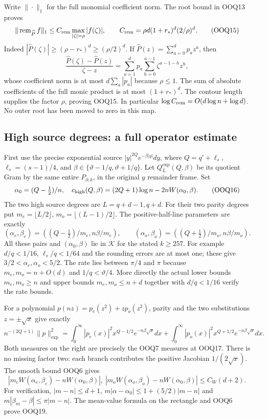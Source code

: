 \documentclass[11pt,a4paper]{article}
\begin{document}
Write $\|\cdot\|_1$ for the full monomial coefficient norm.
The root bound in OOQ13 proves
\[
\|\operatorname{rem}_{\widehat P}f\|_1
 \le C_{\rm rem}\max_{|\zeta|=\rho}|f(\zeta)|,\qquad
C_{\rm rem}=\rho d(1+r_*)^d(2/\rho)^d .
 \tag{OOQ15}
\]
Indeed $|\widehat P(\zeta)|\ge(\rho-r_*)^d\ge(\rho/2)^d$.
If $\widehat P(z)=\sum_{a=0}^d p_a z^a$, then
\[
\frac{\widehat P(\zeta)-\widehat P(z)}{\zeta-z}
 =\sum_{a=1}^d p_a\sum_{h=0}^{a-1}\zeta^{a-1-h}z^h,
\]
whose coefficient norm is at most $d\sum_a|p_a|$
because $\rho\le1$. The sum of absolute coefficients of
the full monic product is at most $(1+r_*)^d$.
The contour length supplies the factor $\rho$, proving OOQ15.
In particular $\log C_{\rm rem}=O(d\log n+\log d)$.
No outer root has been moved to zero in this map.

\subsection{High source degrees: a full operator estimate}

First use the precise exponential source
$|y|^{2Q}e^{-\beta|y|}dy$, where
$Q=q'+\ell_s$, $\ell_s=(s-1)/4$, and
$\beta\in\{\vartheta-1/q,\vartheta+1/q\}$.
Let $Q_{L}^{\exp}(Q,\beta)$ be its quotient Gram by the same
entire $P_{\partial,k}$, in the original $y$ remainder frame.
Set
\[
\alpha_0=(Q-\tfrac12)/n,\quad
c_{\rm high}(Q,\beta)=(2Q+1)\log n-2nW(\alpha_0,\beta).
\tag{OOQ16}
\]
The two high source degrees are $L=q+d-1,q+d$.
For their two parity degrees put
$m_e=\lfloor L/2\rfloor$, $m_o=\lfloor(L-1)/2\rfloor$.
The positive-half-line parameters are exactly
\[
(\alpha_e,\beta_e)=((Q-\tfrac12)/m_e,n\beta/m_e),\qquad
(\alpha_o,\beta_o)=((Q+\tfrac12)/m_o,n\beta/m_o).
\tag{OOQ17}
\]
All these pairs and $(\alpha_0,\beta)$ lie in $\mathcal K$
for the stated $k\ge257$. For example
$d/q<1/16$, $\ell_s/q<1/64$ and the rounding errors are at
most one; these give $3/2<\alpha_e,\alpha_o<5/2$.
The rate lies between $\pi/4$ and $\pi$ because
$m_e,m_o=n+O(d)$ and $1/q<\vartheta/4$.
More directly the actual lower bounds
$m_e,m_o\ge n$ and upper bounds $m_e,m_o\le n+d$
together with $d/q<1/16$ verify the rate bounds.

For a polynomial $p(nz)=p_e(z^2)+z p_o(z^2)$, parity and the
two substitutions $z=\pm\sqrt x$ give exactly
\[
n^{-(2Q+1)}\|p\|_{\exp}^2
 =\int_0^\infty |p_e(x)|^2x^{Q-1/2}e^{-n\beta\sqrt x}dx
 +\int_0^\infty |p_o(x)|^2x^{Q+1/2}e^{-n\beta\sqrt x}dx .
\tag{OOQ18}
\]
Both measures on the right are precisely the OOQ7 measures at
OOQ17. There is no missing factor two: each branch contributes
the positive Jacobian $1/(2\sqrt x)$.
The smooth bound OOQ6 gives
\[
|m_eW(\alpha_e,\beta_e)-nW(\alpha_0,\beta)|,\ 
|m_oW(\alpha_o,\beta_o)-nW(\alpha_0,\beta)|
 \le C_W(d+2).
\tag{OOQ19}
\]
For verification, $|m-n|\le d+1$,
$m|\alpha-\alpha_0|\le1+(5/2)|m-n|$ and
$m|\beta_m-\beta|\le\pi|m-n|$.
The mean-value formula on the rectangle and OOQ6 prove OOQ19.
\end{document}
